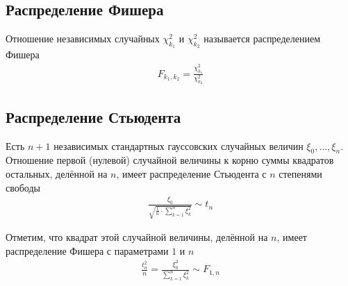 \subsection{Распределение Фишера}
\begin{definition}
  Отношение независимых случайных $\chi_{k_1}^2$ и $\chi_{k_2}^2$ называется
  распределением Фишера
  \begin{align*}
      F_{k_1, k_2} = \frac{\chi_{k_1}^2}{\chi_{k_2}^2}
  \end{align*}
\end{definition}

\subsection{Распределение Стьюдента}
\begin{definition}
  Есть $n+1$ независимых стандартных гауссовских случайных величин
  $\xi_0, \dots, \xi_n$. Отношение первой (нулевой) случайной величины к корню
  суммы квадратов остальных, делённой на $n$, имеет распределение Стьюдента с
  $n$ степенями свободы
  \begin{align*}
      \frac{\xi_0}{\sqrt{\frac{1}{n} \cdot \sum_{k=1}^{n}\xi_k^2}} \sim t_n
  \end{align*}
\end{definition}

Отметим, что квадрат этой случайной величины, делённой на $n$, имеет
распределение Фишера с параметрами $1$ и $n$
\begin{align*}
  \frac{t_n^2}{n}
  = \frac{\xi_0^2}{\sum_{k=1}^{n}\xi_k^2}
  \sim F_{1, n}
\end{align*}

